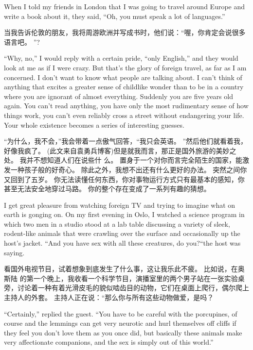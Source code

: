 \documentclass[cs4size, a4paper, 12pt]{article}
\newcounter{numpar}
\newcommand*{\newpar}{\numpar{}}
\begin{document}
	\newpar When I told my friends in London that I was going to travel around Europe and write a book about it, they said, ``Oh, you must speak a lot of languages.''
	
	当我告诉伦敦的朋友，我将周游欧洲并写成书时，他们说：``喔，你肯定会说很多语言吧。 ''?
	
	\newpar ``Why, no,'' I would reply with a certain pride, ``only English,'' and they would look at me as if I were crazy. But that's the glory of foreign travel, as far as I am concerned. I don't want to know what people are talking about. I can't think of anything that excites a greater sense of childlike wonder than to be in a country where you are ignorant of almost everything. Suddenly you are five years old again. You can't read anything, you have only the most rudimentary sense of how things work, you can't even reliably cross a street without endangering your life. Your whole existence becomes a series of interesting guesses.
	
	``为什么，我不会，''我会带着一点傲气回答，``我只会英语。 ''然后他们就看着我，好像我疯了。 (此文来自袁勇兵博客)但是就我而言，那正是国外旅游的美妙之处。 我并不想知道人们在说些什 么。 置身于一个对你而言完全陌生的国家，能激发一种孩子般的好奇心。 除此之外，我想不出还有什么更好的办法。 突然之间你又回到了五岁。 你无法读懂任何东西，你对事物运行方式只有最基本的感知，你甚至无法安全地穿过马路。 你的整个存在变成了一系列有趣的猜想。 
	
	\newpar I get great pleasure from watching foreign TV and trying to imagine what on earth is gonging on. On my first evening in Oslo, I watched a science program in which two men in a studio stood at a lab table discussing a variety of sleek, rodent-like animals that were crawling over the surface and occasionally up the host's jacket. ``And you have sex with all these creatures, do you?``the host was saying.
	
	看国外电视节目，试着想象到底发生了什么事，这让我乐此不疲。 比如说，在奥斯陆 的第一个晚上，我收看一个科学节目，演播室里的两个男子站在一张实验桌旁，讨论着一种有着光滑皮毛的貌似啮齿目的动物，它们在桌面上爬行，偶尔爬上主持人的外套。 主持人正在说：``那么你与所有这些动物做爱，是吗？
	
	\newpar ``Certainly,'' replied the guest. ``You have to be careful with the porcupines, of course and the lemmings can get very neurotic and hurl themselves off cliffs if they feel you don't love them as you once did, but basically these animals make very affectionate companions, and the sex is simply out of this world.''
	
\end{document}
